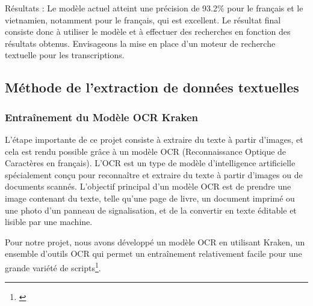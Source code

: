Résultats : Le modèle actuel atteint une précision de 93.2\% pour le français et le vietnamien, notamment pour le français, qui est excellent.
Le résultat final consiste donc à utiliser le modèle et à effectuer des recherches en fonction des résultats obtenus.
Envisageons la mise en place d'un moteur de recherche textuelle pour les transcriptions.

\subsection{Méthode de l'extraction de données textuelles}

\subsubsection{Entraînement du Modèle OCR Kraken}
L'étape importante de ce projet consiste à extraire du texte à partir d'images, et cela est rendu possible grâce à un modèle OCR (Reconnaissance Optique de Caractères en français). L'OCR est un type de modèle d'intelligence artificielle spécialement conçu pour reconnaître et extraire du texte à partir d'images ou de documents scannés. L'objectif principal d'un modèle OCR est de prendre une image contenant du texte, telle qu'une page de livre, un document imprimé ou une photo d'un panneau de signalisation, et de la convertir en texte éditable et lisible par une machine.

Pour notre projet, nous avons développé un modèle OCR en utilisant Kraken, un ensemble d'outils OCR qui permet un entraînement relativement facile pour une grande variété de scripts\footnote{\cite{kraken}}.


